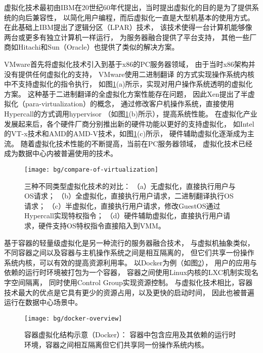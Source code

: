 虚拟化技术最初由IBM在20世纪60年代提出，当时提出虚拟化的目的是为了提供系统的向后兼容性，
以简化用户编程，而后虚拟化一直是大型机基本的使用方式。
在此基础上IBM提出了逻辑分区（LPAR）\cite{IBM_LPAR:2007}技术，
该技术使得一台计算机能够像两台或更多有独立计算机一样运行，
为服务器融合提供了平台支持，
其他一些厂商如Hitachi\cite{hitachi-lpar}和Sun（Oracle）\cite{LDom}也提供了类似的解决方案。

VMware首先将虚拟化技术引入到基于x86的PC服务器领域，
由于当时x86架构并没有提供任何虚拟化的支持，
VMware使用二进制翻译\cite{vmware-compare-hw-sw:2006}
的方式实现操作系统内核中不支持虚拟化的指令执行，
如图\ref{fig:compare-of-virt}(a)所示，实现对用户操作系统透明的虚拟化方案。
这种基于二进制翻译的全虚拟化方案性能存在问题，
因此Xen提出了半虚拟化（para-virtualization）\cite{barham_xen_2003}的概念，
通过修改客户机操作系统，直接使用Hypercall的方式调用hypervisor
（如图\ref{fig:compare-of-virt}(b)所示），提高系统性能。
在虚拟化产业发展起来后，各个硬件厂商分别推出新的硬件功能以更好的支持虚拟化，
如Intel的VT-x技术和AMD的AMD-V技术，如图\ref{fig:compare-of-virt}(c)所示，
硬件辅助虚拟化逐渐成为主流。
随着虚拟化技术性能的不断提高，当前在PC服务器领域，
虚拟化技术已经成为数据中心内被普遍使用的技术。

\begin{figure}[t]
  \centering
  \texttt{[image: bg/compare-of-virtualization]}
  \caption[三种不同类型虚拟化技术的对比]{三种不同类型虚拟化技术的对比：
    （a）无虚拟化，直接执行用户与OS请求；
    （b）全虚拟化，直接执行用户请求，二进制翻译执行OS请求；
    （c）半虚拟化，直接执行用户请求，修改GuestOS通过Hypercall实现特权指令；
    （d）硬件辅助虚拟化，直接执行用户请求，硬件支持OS特权指令直接陷入到VMM。}
  \label{fig:compare-of-virt}
\end{figure}

基于容器的轻量级虚拟化是另一种流行的服务器融合技术，
与虚拟机抽象类似，不同容器之间以及容器与主机操作系统之间是相互隔离的，
但它们共享一份操作系统内核，可以有效的提高资源利用率。
以Docker为例（如图\ref{fig:docker-overview}），
用户的应用与依赖的运行时环境被打包为一个容器，
容器之间使用Linux内核的LXC\cite{lxc}机制实现名字空间隔离，
同时使用Control Group\cite{cgroup}实现资源控制。
与虚拟化技术相比，容器技术最大的优点是它具有更少的资源占用，以及更快的启动时间，
因此也被普遍运行在数据中心场景中。

\begin{figure}[htb]
  \centering
  \begin{minipage}{0.75\textwidth}
    \texttt{[image: bg/docker-overview]}
    \caption[容器虚拟化结构示意（Docker）]{容器虚拟化结构示意（Docker）：
      容器中包含应用及其依赖的运行时环境，容器之间相互隔离但它们共享同一份操作系统内核。}
    \label{fig:docker-overview}
  \end{minipage}
\end{figure}

